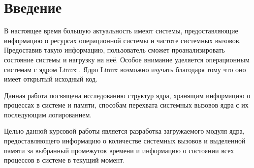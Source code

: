 \chapter*{Введение}

В настоящее время большую актуальность имеют системы, предоставляющие информацию о ресурсах операционной системы и частоте системных вызовов. Предоставив такую информацию, пользователь сможет проанализировать состояние системы и нагрузку на неё. Особое внимание уделяется операционным системам с ядром Linux \cite{linux}. Ядро Linux возможно изучать благодаря тому что оно имеет открытый исходный код. 

Данная работа посвящена исследованию структур ядра, хранящим информацию о процессах в системе и памяти, способам перехвата системных вызовов ядра с их последующим логированием.

Целью данной курсовой работы является разработка загружаемого модуля ядра, предоставляющего информацию о количестве системных вызовов и выделенной памяти за выбранный промежуток времени и информацию о состоянии всех процессов в системе в текущий момент.


